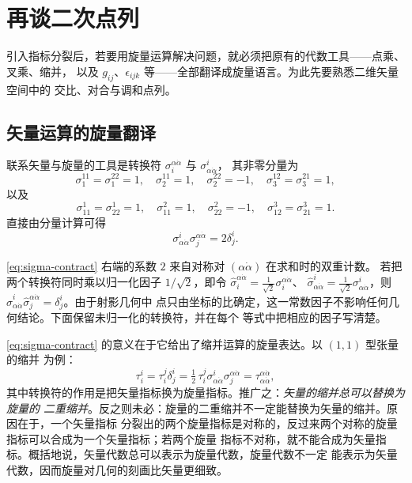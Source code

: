 \chapter{再谈二次点列}

引入指标分裂后，若要用旋量运算解决问题，就必须把原有的代数工具——点乘、叉乘、缩并，
以及 $g_{ij}$、$\epsilon_{ijk}$ 等——全部翻译成旋量语言。为此先要熟悉二维矢量空间中的
交比、对合与调和点列。

\section{矢量运算的旋量翻译}

联系矢量与旋量的工具是转换符 $\sigma^{\alpha\dot\alpha}_i$ 与 $\sigma^i_{\alpha\dot\alpha}$，
其非零分量为
\[
\sigma^{11}_1=\sigma^{22}_1=1,\quad \sigma^{11}_2=1,\quad \sigma^{22}_2=-1,\quad
\sigma^{12}_3=\sigma^{21}_3=1,
\]
以及
\[
\sigma^1_{11}=\sigma^1_{22}=1,\quad \sigma^2_{11}=1,\quad \sigma^2_{22}=-1,\quad
\sigma^3_{12}=\sigma^3_{21}=1 .
\]
直接由分量计算可得
\begin{equation}\label{eq:sigma-contract}
\sigma^i_{\alpha\dot\alpha}\sigma^{\alpha\dot\alpha}_j=2\delta^i_j .
\end{equation}

\begin{remark}[归一化]
\eqref{eq:sigma-contract} 右端的系数 $2$ 来自对称对 $(\alpha\dot\alpha)$ 在求和时的双重计数。
若把两个转换符同时乘以归一化因子 $1/\sqrt2$，即令
$\hat\sigma^{\alpha\dot\alpha}_i=\frac1{\sqrt2}\sigma^{\alpha\dot\alpha}_i$、
$\hat\sigma^i_{\alpha\dot\alpha}=\frac1{\sqrt2}\sigma^i_{\alpha\dot\alpha}$，则
$\hat\sigma^i_{\alpha\dot\alpha}\hat\sigma^{\alpha\dot\alpha}_j=\delta^i_j$。由于射影几何中
点只由坐标的比确定，这一常数因子不影响任何几何结论。下面保留未归一化的转换符，并在每个
等式中把相应的因子写清楚。
\end{remark}

\eqref{eq:sigma-contract} 的意义在于它给出了缩并运算的旋量表达。以 $(1,1)$ 型张量的缩并
为例：
\[
\tau^i_i=\tau^j_i\delta^i_j=\tfrac12\,\tau^j_i\sigma^i_{\alpha\dot\alpha}\sigma^{\alpha\dot\alpha}_j
=\tau^{\alpha\dot\alpha}_{\alpha\dot\alpha},
\]
其中转换符的作用是把矢量指标换为旋量指标。推广之：\emph{矢量的缩并总可以替换为旋量的
二重缩并}。反之则未必：旋量的二重缩并不一定能替换为矢量的缩并。原因在于，一个矢量指标
分裂出的两个旋量指标是对称的，反过来两个对称的旋量指标可以合成为一个矢量指标；若两个旋量
指标不对称，就不能合成为矢量指标。概括地说，矢量代数总可以表示为旋量代数，旋量代数不一定
能表示为矢量代数，因而旋量对几何的刻画比矢量更细致。

